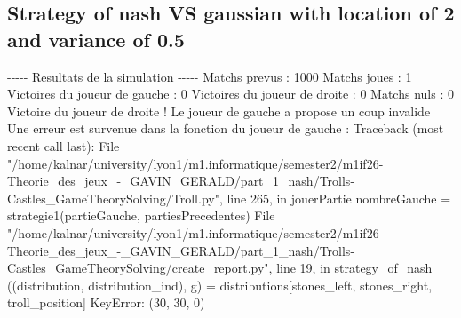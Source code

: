 \documentclass{article}%
\begin{document}
%
\subsection{Strategy of nash VS gaussian with location of 2 and variance of 0.5}%
\label{subsec:Strategy of nash VS gaussian with location of 2 and variance of 0.5}%
{-}{-}{-}{-}{-} Resultats de la simulation {-}{-}{-}{-}{-}\newline%
		\newline%
Matchs prevus : 1000\newline%
Matchs joues : 1\newline%
\newline%
Victoires du joueur de gauche : 0\newline%
Victoires du joueur de droite : 0\newline%
Matchs nuls : 0\newline%
\newline%
Victoire du joueur de droite ! Le joueur de gauche a propose un coup invalide\newline%
Une erreur est survenue dans la fonction du joueur de gauche : \newline%
Traceback (most recent call last):\newline%
  File "/home/kalnar/university/lyon1/m1.informatique/semester2/m1if26{-}Theorie\_des\_jeux\_{-}\_GAVIN\_GERALD/part\_1\_nash/Trolls{-}Castles\_GameTheorySolving/Troll.py", line 265, in jouerPartie\newline%
    nombreGauche = strategie1(partieGauche, partiesPrecedentes)\newline%
  File "/home/kalnar/university/lyon1/m1.informatique/semester2/m1if26{-}Theorie\_des\_jeux\_{-}\_GAVIN\_GERALD/part\_1\_nash/Trolls{-}Castles\_GameTheorySolving/create\_report.py", line 19, in strategy\_of\_nash\newline%
    ((distribution, distribution\_ind), g) = distributions{[}stones\_left, stones\_right, troll\_position{]}\newline%
KeyError: (30, 30, 0)\newline%

%
\end{document}
